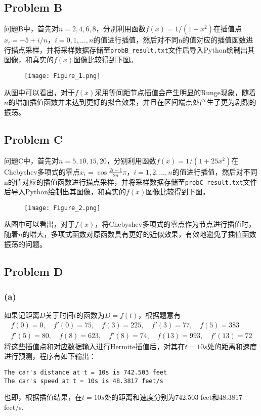 \documentclass{ctexart}
\begin{document}
\begin{sloppypar}
\subsection*{Problem B}
问题B中，首先对$n = 2,4,6,8$，分别利用函数$f(x) = 1/(1+x^2)$在插值点$x_i = -5 +i/n$，$i = 0,1,\dots,n$的值进行插值，然后对不同n的值对应的插值函数进行描点采样，并将采样数据存储至\verb|probB_result.txt|文件后导入Python绘制出其图像，和真实的$f(x)$图像比较得到下图。
\begin{figure}[H]
\centering
\texttt{[image: Figure\_1.png]}
\label{Fig1}
\end{figure}

从图中可以看出，对于$f(x)$采用等间距节点插值会产生明显的Runge现象，随着$n$的增加插值函数并未达到更好的拟合效果，并且在区间端点处产生了更为剧烈的振荡。

\subsection*{Problem C}
问题C中，首先对$n = 5,10,15,20$，分别利用函数$f(x) = 1/(1+25x^2)$在Chebyshev多项式的零点$x_i =\cos \frac{2i-1}{2n}\pi$，$i = 1,2,\dots,n$的值进行插值，然后对不同n的值对应的插值函数进行描点采样，并将采样数据存储至\verb|probC_result.txt|文件后导入Python绘制出其图像，和真实的$f(x)$图像比较得到下图。
\begin{figure}[H]
\centering
\texttt{[image: Figure\_2.png]}
\label{Fig2}
\end{figure}

从图中可以看出，对于$f(x)$，将Chebyshev多项式的零点作为节点进行插值时，随着$n$的增大，多项式函数对原函数具有更好的近似效果，有效地避免了插值函数振荡的问题。

\subsection*{Problem D}
\subsubsection*{(a)} 如果记距离$D$关于时间$t$的函数为$D=f(t)$，根据题意有
\begin{equation}
\begin{split}
    f(0)=0,\quad f'(0)=75,\quad f(3)=225,\quad f'(3)=77,\quad f(5)=383 \\
    f'(5)=80,\quad f(8)=623,\quad f'(8)=74,\quad f(13)=993,\quad f'(13)=72
\end{split}
\end{equation}
将这些插值点和对应数据输入进行Hermite插值后，对其在$t=10s$处的距离和速度进行预测，程序有如下输出：
\begin{shaded}
\begin{verbatim}
The car's distance at t = 10s is 742.503 feet
The car's speed at t = 10s is 48.3817 feet/s
\end{verbatim}
\end{shaded}
也即，根据插值结果，在$t=10s$处的距离和速度分别为742.503 feet和48.3817 feet/s.

\end{sloppypar}
\end{document}
